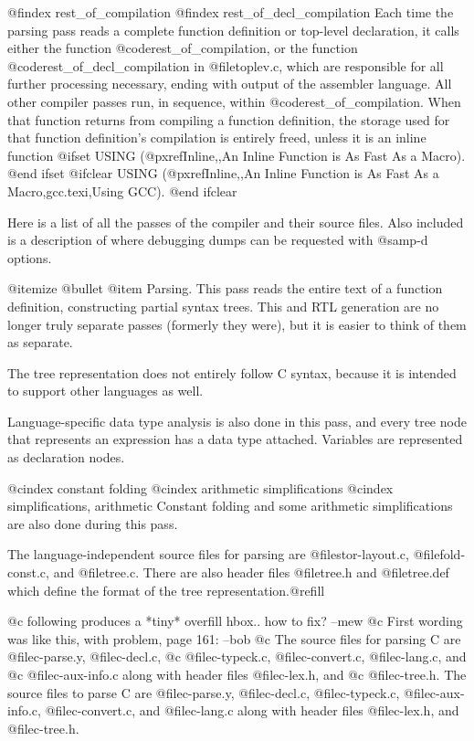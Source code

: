 @findex rest_of_compilation
@findex rest_of_decl_compilation
Each time the parsing pass reads a complete function definition or
top-level declaration, it calls either the function
@code{rest_of_compilation}, or the function
@code{rest_of_decl_compilation} in @file{toplev.c}, which are
responsible for all further processing necessary, ending with output of
the assembler language.  All other compiler passes run, in sequence,
within @code{rest_of_compilation}.  When that function returns from
compiling a function definition, the storage used for that function
definition's compilation is entirely freed, unless it is an inline
function
@ifset USING
(@pxref{Inline,,An Inline Function is As Fast As a Macro}).
@end ifset
@ifclear USING
(@pxref{Inline,,An Inline Function is As Fast As a Macro,gcc.texi,Using GCC}).
@end ifclear

Here is a list of all the passes of the compiler and their source files.
Also included is a description of where debugging dumps can be requested
with @samp{-d} options.

@itemize @bullet
@item
Parsing.  This pass reads the entire text of a function definition,
constructing partial syntax trees.  This and RTL generation are no longer
truly separate passes (formerly they were), but it is easier to think
of them as separate.

The tree representation does not entirely follow C syntax, because it is
intended to support other languages as well.

Language-specific data type analysis is also done in this pass, and every
tree node that represents an expression has a data type attached.
Variables are represented as declaration nodes.

@cindex constant folding
@cindex arithmetic simplifications
@cindex simplifications, arithmetic
Constant folding and some arithmetic simplifications are also done
during this pass.

The language-independent source files for parsing are
@file{stor-layout.c}, @file{fold-const.c}, and @file{tree.c}.
There are also header files @file{tree.h} and @file{tree.def}
which define the format of the tree representation.@refill

@c following produces a *tiny* overfill hbox.. how to fix?  --mew
@c First wording was like this, with problem, page 161:  --bob
@c The source files for parsing C are @file{c-parse.y}, @file{c-decl.c},
@c @file{c-typeck.c}, @file{c-convert.c}, @file{c-lang.c}, and
@c @file{c-aux-info.c} along with header files @file{c-lex.h}, and
@c @file{c-tree.h}.
The source files to parse C are 
@file{c-parse.y}, 
@file{c-decl.c},
@file{c-typeck.c}, 
@file{c-aux-info.c},
@file{c-convert.c}, 
and @file{c-lang.c}
along with header files 
@file{c-lex.h}, and
@file{c-tree.h}.

